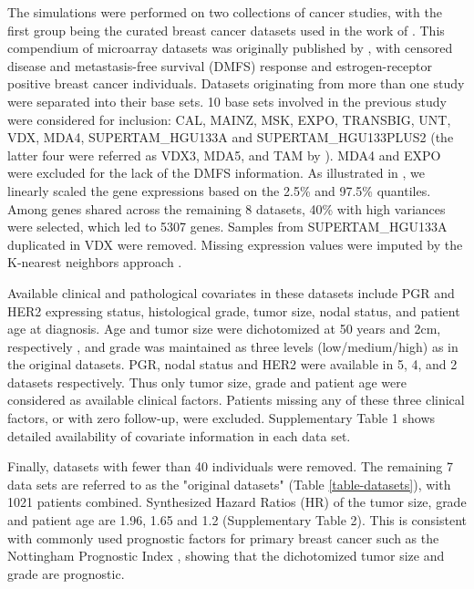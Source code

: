 \documentclass{bioinfo}
\begin{document}
  The simulations were performed on two collections of cancer studies, with the first group
   being the curated breast cancer datasets used in the work of \citet{Bernau2014}.
  This compendium of microarray datasets was originally published by \citet{Haibe-Kains2012},
  with censored disease and metastasis-free survival (DMFS) response 
  and estrogen-receptor positive breast cancer individuals. Datasets originating
  from more than one study were separated into their base sets. 10 base
  sets involved in the previous study were considered for inclusion:
  CAL, MAINZ, MSK, EXPO, TRANSBIG, UNT, VDX,
  MDA4, SUPERTAM\_HGU133A and SUPERTAM\_HGU133PLUS2 (the latter four
  were referred as VDX3, MDA5, and TAM by \citet{Bernau2014}). MDA4 and EXPO were
  excluded for the lack of the DMFS information. As illustrated in \citet{Haibe-Kains2012}, 
  we linearly scaled the gene expressions based on the 2.5\% and 97.5\% quantiles. Among genes
  shared across the remaining 8 datasets, 40\% with high variances 
  were selected, which led to 5307 genes. 
  Samples from SUPERTAM\_HGU133A duplicated in VDX were removed. 
  Missing expression values were imputed by the K-nearest neighbors approach \citep{KNN}.

  Available clinical and pathological covariates in these datasets include PGR and HER2 expressing status, histological
  grade, tumor size, nodal status, and patient age at diagnosis. Age and tumor size were
  dichotomized at 50 years and 2cm, respectively
  \citep{Haibe-Kains2012}, and grade was maintained as three levels
  (low/medium/high) as in the original datasets. 
PGR, nodal status and HER2 were available in 5, 4, and 2
  datasets respectively. Thus only tumor size, grade and patient age 
  were considered as available clinical factors. 
  Patients missing any of these three 
  clinical factors, or with zero follow-up, were
  excluded. Supplementary Table 1 shows detailed availability of covariate information in each data
  set.
  
  Finally, datasets with fewer than 40 individuals were
  removed. The remaining 7 data sets are referred to as the
  "original datasets" (Table \ref{table-datasets}), with 1021 patients combined. 
  Synthesized Hazard Ratios (HR) of the tumor size, grade and patient age are 1.96, 1.65 and 1.2 
  (Supplementary Table 2). This is consistent with commonly
  used prognostic factors for primary breast cancer such as the
  Nottingham Prognostic Index \citep{haybittle1982prognostic}, 
  showing that the dichotomized tumor size
  and grade are prognostic. 
     
\end{document}
